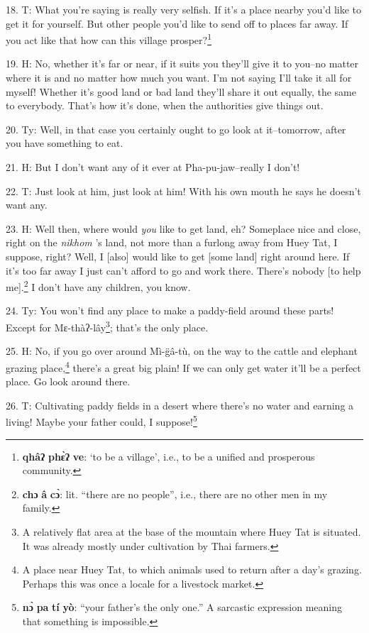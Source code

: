 18. T: What you're saying is really very selfish. If it's a place nearby you'd
like to get it for yourself. But other people you'd like to send off to places
far away. If you act like that how can this village prosper?\footnote{\textbf{qhâʔ} \textbf{phɛ̀ʔ} \textbf{ve}: `to be a village', i.e., to be a unified and prosperous community.}

19. H: No, whether it's far or near, if it suits you they'll give it to you--no
matter where it is and no matter how much you want. I'm not saying I'll take it
all for myself! Whether it's good land or bad land they'll share it out equally,
the same to everybody. That's how it's done, when the authorities give things out.

20. Ty: Well, in that case you certainly ought to go look at it--tomorrow,
after you have something to eat.

21. H: But I don't want any of it ever at Pha-pu-jaw--really I don't!

22. T: Just look at him, just look at him! With his own mouth he says he doesn't
want any.

23. H: Well then, where would \textit{you } like to get land, eh? Someplace nice
and close, right on the \textit{nikhom }'s land, not more than a furlong away
from Huey Tat, I suppose, right? Well, I [also] would like to get [some land] right
around here. If it's too far away I just can't afford to go and work there. There's
nobody [to help me].\footnote{\textbf{chɔ} \textbf{â} \textbf{cɔ̀}: lit. ``there are no people'', i.e., there are no other men in my family.} I don't have any children, you know.

24. Ty: You won't find any place to make a paddy-field around these parts!
Except for Mɛ-thàʔ-lây\footnote{A relatively flat area at the base of the mountain where Huey Tat is situated. It was already mostly under cultivation by Thai farmers.}; that's the only place.

25. H: No, if you go over around Mì-g̈â-tù, on the way to the cattle and elephant
grazing place,\footnote{A place near Huey Tat, to which animals used to return after a day's grazing. Perhaps this was once a locale for a livestock market.} there's a great big plain! If we can only get water it'll be
a perfect place. Go look around there.

26. T: Cultivating paddy fields in a desert where there's no water and earning
a living! Maybe your father could, I suppose!\footnote{\textbf{nɔ̀} \textbf{pa} \textbf{tí} \textbf{yò}: ``your father's the only one.'' A sarcastic expression meaning that something is impossible.}

